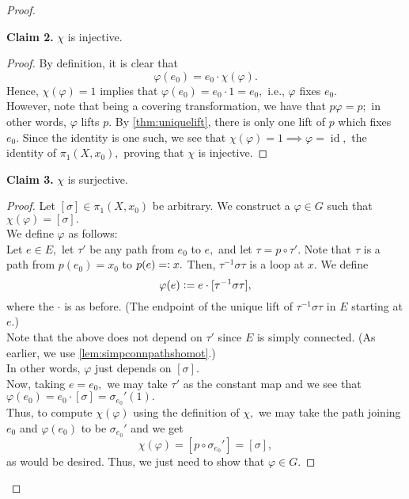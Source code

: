 \documentclass[12pt]{article}
\theoremstyle{definition}
\numberwithin{thm}{section}
\newcommand{\id}{\operatorname{id}}
\newenvironment{blockquote}
{\begin{mdframed}[skipabove=0pt, skipbelow=0pt, innertopmargin=4pt, innerbottommargin=4pt, bottomline=false,topline=false,rightline=false, linewidth=2pt]}
{\end{mdframed}}
\begin{document}
\begin{proof}
	\begin{blockquote}
		\textbf{Claim 2.} $\chi$ is injective.
		\begin{proof} 
			By definition, it is clear that 
			\begin{equation*} 
				\varphi(e_0) = e_0\cdot\chi(\varphi).
			\end{equation*}
			Hence, $\chi(\varphi) = 1$ implies that $\varphi(e_0) = e_0\cdot1 = e_0,$ i.e., $\varphi$ fixes $e_0.$\\
			However, note that being a covering transformation, we have that $p\varphi = p;$ in other words, $\varphi$ lifts $p.$ By \ref{thm:uniquelift}, there is only one lift of $p$ which fixes $e_0.$ Since the identity is one such, we see that $\chi(\varphi) = 1 \implies \varphi = \id,$ the identity of $\pi_1(X, x_0),$ proving that $\chi$ is injective. 
		\end{proof}
	\end{blockquote}

	\begin{blockquote}
		\textbf{Claim 3.} $\chi$ is surjective.
		\begin{proof} 
			Let $[\sigma]\in\pi_1(X, x_0)$ be arbitrary. We construct a $\varphi \in G$ such that $\chi(\varphi) = [\sigma].$\\
			We define $\varphi$ as follows:\\
			Let $e \in E,$ let $\tau'$ be any path from $e_0$ to $e,$ and let $\tau = p\circ\tau'.$ Note that $\tau$ is a path from $p(e_0) = x_0$ to $p(e) =\vcentcolon x.$ Then, $\tau^{-1}\sigma\tau$ is a loop at $x.$ We define
			\begin{equation*} 
				\varphi(e) \vcentcolon= e\cdot[\tau^{-1}\sigma\tau],
			\end{equation*}
			where the $\cdot$ is as before. (The endpoint of the unique lift of $\tau^{-1}\sigma\tau$ in $E$ starting at $e.$)\\
			Note that the above does not depend on $\tau'$ since $E$ is simply connected. (As earlier, we use \cref{lem:simpconnpathshomot}.)\\
			In other words, $\varphi$ just depends on $[\sigma].$\\
			Now, taking $e = e_0,$ we may take $\tau'$ as the constant map and we see that $\varphi(e_0) = e_0\cdot[\sigma] = \sigma_{e_0}'(1).$\\
			Thus, to compute $\chi(\varphi)$ using the definition of $\chi,$ we may take the path joining $e_0$ and $\varphi(e_0)$ to be $\sigma_{e_0}'$ and we get
			\begin{equation*} 
				\chi(\varphi) = [p \circ \sigma_{e_0}'] = [\sigma],
			\end{equation*}
			as would be desired. Thus, we just need to show that $\varphi \in G.$


\end{proof}
\end{blockquote}
\end{proof}
\end{document}
